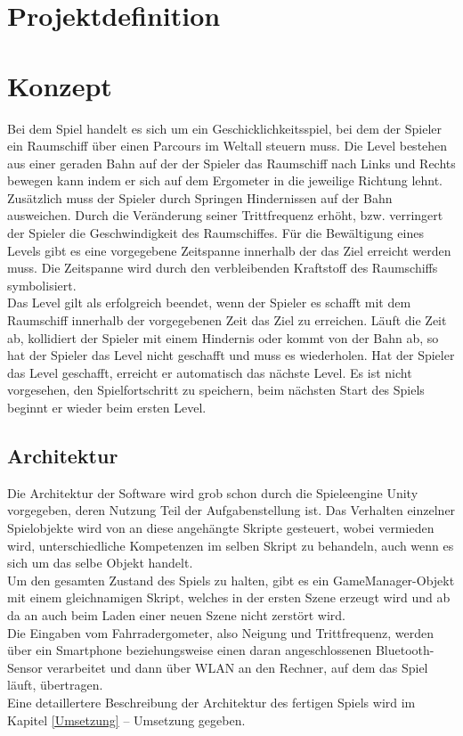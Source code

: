 

\chapter{Projektdefinition}


\chapter{Konzept}
Bei dem Spiel handelt es sich um ein Geschicklichkeitsspiel, bei dem der Spieler ein Raumschiff über einen Parcours im Weltall steuern muss. Die Level bestehen aus einer geraden Bahn auf der der Spieler das Raumschiff nach Links und Rechts bewegen kann indem er sich auf dem Ergometer in die jeweilige Richtung lehnt. Zusätzlich muss der Spieler durch Springen Hindernissen auf der Bahn ausweichen. Durch die Veränderung seiner Trittfrequenz erhöht, bzw. verringert der Spieler die Geschwindigkeit des Raumschiffes. Für die Bewältigung eines Levels gibt es eine vorgegebene Zeitspanne innerhalb der das Ziel erreicht werden muss. Die Zeitspanne wird durch den verbleibenden Kraftstoff des Raumschiffs symbolisiert.\\
Das Level gilt als erfolgreich beendet, wenn der Spieler es schafft mit dem Raumschiff innerhalb der vorgegebenen Zeit das Ziel zu erreichen. Läuft die Zeit ab, kollidiert der Spieler mit einem Hindernis oder kommt von der Bahn ab, so hat der Spieler das Level nicht geschafft und muss es wiederholen. Hat der Spieler das Level geschafft, erreicht er automatisch das nächste Level. Es ist nicht vorgesehen, den Spielfortschritt zu speichern, beim nächsten Start des Spiels beginnt er wieder beim ersten Level.
\section{Architektur}
Die Architektur der Software wird grob schon durch die Spieleengine Unity vorgegeben, deren Nutzung Teil der Aufgabenstellung ist. Das Verhalten einzelner Spielobjekte wird von an diese angehängte Skripte gesteuert, wobei vermieden wird, unterschiedliche Kompetenzen im selben Skript zu behandeln, auch wenn es sich um das selbe Objekt handelt.\\
Um den gesamten Zustand des Spiels zu halten, gibt es ein GameManager-Objekt mit einem gleichnamigen Skript, welches in der ersten Szene erzeugt wird und ab da an auch beim Laden einer neuen Szene nicht zerstört wird.\\
Die Eingaben vom Fahrradergometer, also Neigung und Trittfrequenz, werden über ein Smartphone beziehungsweise einen daran angeschlossenen Bluetooth-Sensor verarbeitet und dann über WLAN an den Rechner, auf dem das Spiel läuft, übertragen.\\
Eine detaillertere Beschreibung der Architektur des fertigen Spiels wird im Kapitel \ref{Umsetzung} -- Umsetzung gegeben.

